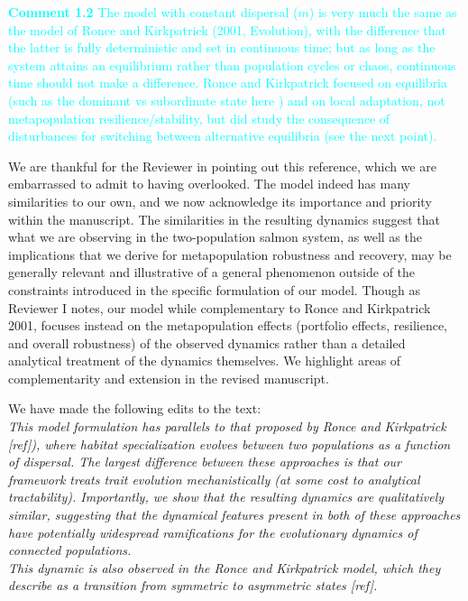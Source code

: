 \documentclass[ucm,12pt]{ucletter}
\begin{document}
\begin{letter}
\noindent \textcolor{cyan}{
{\bf Comment 1.2} The model with constant dispersal ($m$) is very much the same as the model of Ronce and Kirkpatrick (2001, Evolution), with the difference that the latter is fully deterministic and set in continuous time; but as long as the system attains an equilibrium rather than population cycles or chaos, continuous time should not make a difference. Ronce and Kirkpatrick focused on equilibria (such as the dominant vs subordinate state here ) and on local adaptation, not metapopulation resilience/stability, but did study the consequence of disturbances for switching between alternative equilibria (see the next point).
}

 We are thankful for the Reviewer in pointing out this reference, which we are embarrassed to admit to having overlooked. The model indeed has many similarities to our own, and we now acknowledge its importance and priority within the manuscript. The similarities in the resulting dynamics suggest that what we are observing in the two-population salmon system, as well as the implications that we derive for metapopulation robustness and recovery, may be generally relevant and illustrative of a general phenomenon outside of the constraints introduced in the specific formulation of our model. Though as Reviewer I notes, our model while complementary to Ronce and Kirkpatrick 2001, focuses instead on the metapopulation effects (portfolio effects, resilience, and overall robustness) of the observed dynamics rather than a detailed analytical treatment of the dynamics themselves. We highlight areas of complementarity and extension in the revised manuscript.

\noindent We have made the following edits to the text:\\
 \emph{This model formulation has parallels to that proposed by Ronce and Kirkpatrick [ref]), where habitat specialization evolves between two populations as a function of dispersal.
The largest difference between these approaches is that our framework treats trait evolution mechanistically (at some cost to analytical tractability).
Importantly, we show that the resulting dynamics are qualitatively similar, suggesting that the dynamical features present in both of these approaches have potentially widespread ramifications for the evolutionary dynamics of connected populations.}\\
 \emph{This dynamic is also observed in the Ronce and Kirkpatrick model, which they describe as a transition from symmetric to asymmetric states [ref].}



\end{letter}
\end{document}
